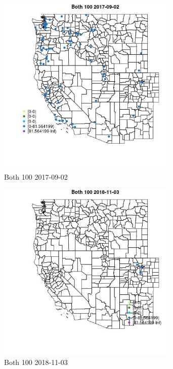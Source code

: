 \begin{figure} 
\centering  
\includegraphics[width=0.77\textwidth]{Code_Outputs/Report_ML_input_PM25_Step4_part_e_de_duplicated_aveswNAs_MapObsBoth_1002017-09-02.jpg} 
\caption{\label{fig:Report_ML_input_PM25_Step4_part_e_de_duplicated_aveswNAsMapObsBoth_1002017-09-02}Both 100 2017-09-02} 
\end{figure} 
 

\begin{figure} 
\centering  
\includegraphics[width=0.77\textwidth]{Code_Outputs/Report_ML_input_PM25_Step4_part_e_de_duplicated_aveswNAs_MapObsBoth_1002018-11-03.jpg} 
\caption{\label{fig:Report_ML_input_PM25_Step4_part_e_de_duplicated_aveswNAsMapObsBoth_1002018-11-03}Both 100 2018-11-03} 
\end{figure} 
 

